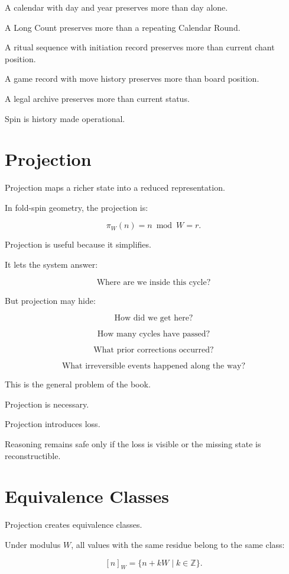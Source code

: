 \documentclass[11pt]{book}
\begin{document}
A calendar with day and year preserves more than day alone.

A Long Count preserves more than a repeating Calendar Round.

A ritual sequence with initiation record preserves more than current chant position.

A game record with move history preserves more than board position.

A legal archive preserves more than current status.

Spin is history made operational.

\section{Projection}

Projection maps a richer state into a reduced representation.

In fold-spin geometry, the projection is:

\[
\pi_W(n) = n \bmod W = r.
\]

Projection is useful because it simplifies.

It lets the system answer:

\[
\text{Where are we inside this cycle?}
\]

But projection may hide:

\[
\text{How did we get here?}
\]

\[
\text{How many cycles have passed?}
\]

\[
\text{What prior corrections occurred?}
\]

\[
\text{What irreversible events happened along the way?}
\]

This is the general problem of the book.

Projection is necessary.

Projection introduces loss.

Reasoning remains safe only if the loss is visible or the missing state is reconstructible.

\section{Equivalence Classes}

Projection creates equivalence classes.

Under modulus \(W\), all values with the same residue belong to the same class:

\[
[n]_W = \{n + kW \mid k \in \mathbb{Z}\}.
\]
\end{document}
